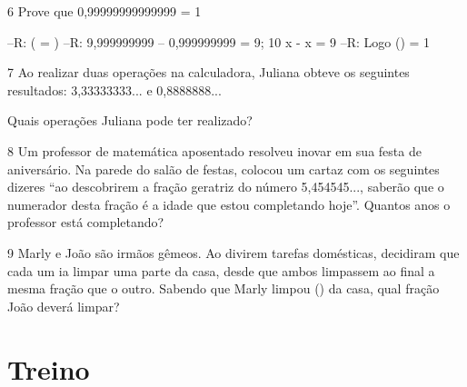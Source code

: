 \num{6} Prove que 0,99999999999999 = 1

--R: ( = )
--R: 9,999999999 -- 0,999999999 = 9;  10 x - x = 9 
--R: Logo () = 1





\num{7} Ao realizar duas operações na calculadora, Juliana obteve os
seguintes resultados: 3,33333333... e 0,8888888...

Quais operações Juliana pode ter realizado?


\num{8} Um professor de matemática aposentado resolveu inovar em sua festa de
aniversário. Na parede do salão de festas, colocou um cartaz com os
seguintes dizeres ``ao descobrirem a fração geratriz do número
5,454545..., saberão que o numerador desta fração é a idade que estou
completando hoje''. Quantos anos o professor está completando?




\num{9} Marly e João são irmãos gêmeos. Ao divirem tarefas domésticas,
decidiram que cada um ia limpar uma parte da casa, desde que ambos
limpassem ao final a mesma fração que o outro. Sabendo que Marly limpou
() da casa, qual fração João deverá limpar?


\section{Treino}

